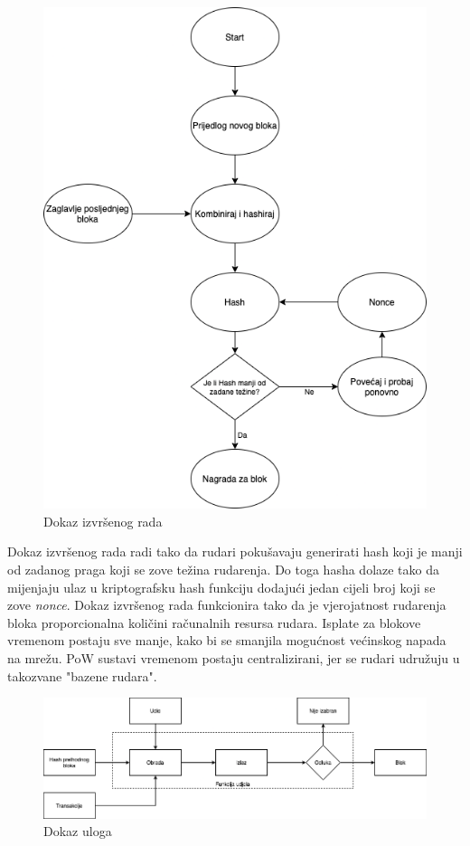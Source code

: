 \documentclass[times, utf8, diplomski]{fer}
\begin{document}
\begin{figure}[htb]
\centering
\includegraphics[width=12cm]{imgs/PoW.png}
\caption{Dokaz izvršenog rada}
\label{fig:pow}
\end{figure}

Dokaz izvršenog rada radi tako da rudari pokušavaju generirati hash koji je manji od zadanog praga koji se zove težina rudarenja. Do toga hasha dolaze tako da mijenjaju ulaz u kriptografsku hash funkciju dodajući jedan cijeli broj koji se zove \textit{nonce}.  Dokaz izvršenog rada funkcionira tako da je vjerojatnost rudarenja bloka proporcionalna količini računalnih resursa rudara. Isplate za blokove vremenom postaju sve manje, kako bi se smanjila mogućnost većinskog napada na mrežu. PoW sustavi vremenom postaju centralizirani, jer se rudari udružuju u takozvane "bazene rudara".

\begin{figure}[htb]
\centering
\includegraphics[width=12cm]{imgs/PoS.png}
\caption{Dokaz uloga}
\label{fig:pos}
\end{figure}
\end{document}
